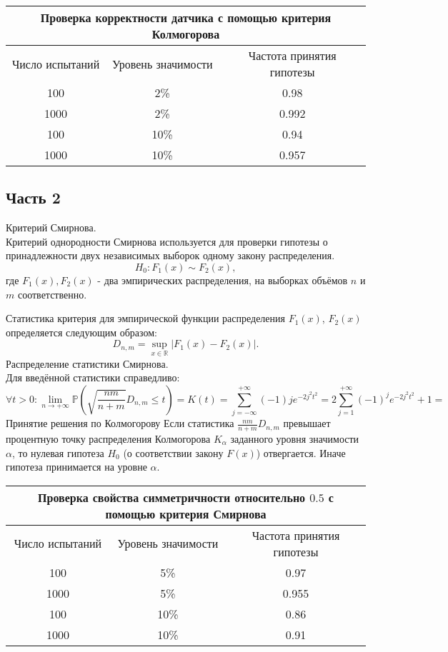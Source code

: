 \documentclass[11pt]{article}
\begin{document}
\begin{tabular}{|c|c|c|}
\hline
\multicolumn{3}{|c|}{Проверка корректности датчика с помощью критерия Колмогорова} \\
\hline
Число испытаний & Уровень значимости & Частота принятия гипотезы \\
\hline
100 & 2\% & 0.98 \\
1000 & 2\% & 0.992 \\
100 & 10\% & 0.94 \\
1000 & 10\% & 0.957 \\
\hline
\end{tabular}

\subsection{Часть 2}

Критерий Смирнова. \\
Критерий однородности Смирнова используется для проверки гипотезы о принадлежности двух независимых выборок одному закону распределения. 
$$
H_0 : F_{1}(x) \sim F_{2}(x),
$$
где $F_1(x), F_2(x)$ - два эмпирических распределения, на выборках объёмов $n$ и $m$ соответственно.

Статистика критерия для эмпирической функции распределения $F_1(x)$, $F_2(x)$ определяется следующим образом:
\[
 D_{n,m} = \sup\limits_{x \in \mathbb{R}} |F_1(x) - F_2(x)|.
\]
Распределение статистики Смирнова. \\
Для введённой статистики справедливо:
\[
 \forall t > 0: \lim\limits_{n \to + \infty} \mathbb{P}(\sqrt{\frac{nm}{n + m}}D_{n,m} \leqslant t) = K(t) = \sum\limits_{j = - \infty}^{+\infty} (-1){j} e^{-2j^2t^2} = 2 \sum\limits_{j = 1}^{+\infty} (-1)^{j} e^{-2j^2t^2} + 1 =  
\]
Принятие решения по Колмогорову
Если статистика $\frac{nm}{n + m}D_{n,m}$ превышает процентную точку распределения Колмогорова $K_{\alpha}$ заданного уровня значимости $\alpha$, то нулевая гипотеза $H_0$ (о соответствии закону $F(x)$) отвергается. Иначе гипотеза принимается на уровне $\alpha$.



\begin{tabular}{|c|c|c|}
\hline
\multicolumn{3}{|c|}{Проверка свойства симметричности относительно $0.5$ с помощью критерия Смирнова} \\
\hline
Число испытаний & Уровень значимости & Частота принятия гипотезы \\
\hline
100 & 5\% & 0.97 \\
1000 & 5\% & 0.955 \\
100 & 10\% & 0.86 \\
1000 & 10\% & 0.91 \\
\hline
\end{tabular}
\end{document}
